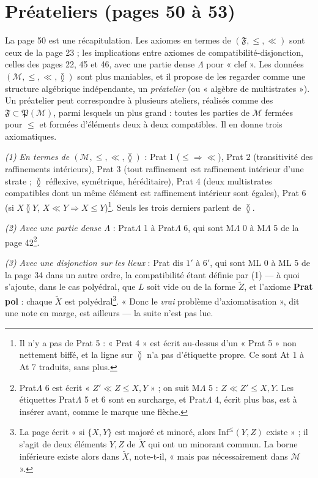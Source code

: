 \documentclass[11pt,a4paper]{article}
\begin{document}
\section*{Préateliers (pages 50 à 53)}

La page 50 est une récapitulation. Les axiomes en termes de $(\mathfrak{F}, \leq,
\ll)$ sont ceux de la page 23 ; les implications entre axiomes de
compatibilité-disjonction, celles des pages 22, 45 et 46, avec une partie dense
$\Lambda$ pour « clef ». Les données $(\mathcal{M}, \leq, \ll, \between)$ sont plus
maniables, et il propose de les regarder comme une structure algébrique
indépendante, un \emph{préatelier} (ou « algèbre de multistrates »). Un préatelier
peut correspondre à plusieurs ateliers, réalisés comme des $\mathfrak{F} \subset
\mathfrak{P}(\mathcal{M})$, parmi lesquels un plus grand : toutes les parties de
$\mathcal{M}$ fermées pour $\leq$ et formées d'éléments deux à deux compatibles.
Il en donne trois axiomatiques.

\emph{(1) En termes de $(\mathcal{M}, \leq, \ll, \between)$} : Prat 1 ($\leq
\Rightarrow \ll$), Prat 2 (transitivité des raffinements intérieurs), Prat 3
(tout raffinement est raffinement intérieur d'une strate ; $\between$ réflexive,
symétrique, héréditaire), Prat 4 (deux multistrates compatibles dont un même
élément est raffinement intérieur sont égales), Prat 6 (si $X \between Y$, $X \ll Y \Rightarrow X \leq
Y$)\footnote{Il n'y a pas de Prat 5 : « Prat 4 » est écrit au-dessus d'un « Prat
5 » non nettement biffé, et la ligne sur $\between$ n'a pas d'étiquette propre.
Ce sont At 1 à At 7 traduits, sans plus.}. Seuls les trois derniers parlent de
$\between$.

\emph{(2) Avec une partie dense $\Lambda$} : Prat$\Lambda$ 1 à Prat$\Lambda$ 6, qui
sont M$\Lambda$ 0 à M$\Lambda$ 5 de la page 42\footnote{Prat$\Lambda$ 6 est écrit
« $Z' \ll Z \leq X, Y$ » ; on suit M$\Lambda$ 5 : $Z \ll Z' \leq X, Y$. Les
étiquettes Prat$\Lambda$ 5 et 6 sont en surcharge, et Prat$\Lambda$ 4, écrit plus
bas, est à insérer avant, comme le marque une flèche.}.

\emph{(3) Avec une disjonction sur les lieux} : Prat dis $1'$ à $6'$, qui sont ML
0 à ML 5 de la page 34 dans un autre ordre, la compatibilité étant définie par (1) --- à quoi s'ajoute,
dans le cas polyédral, que $L$ soit vide ou de la forme $\widetilde{Z}$, et
l'axiome \textbf{Prat pol} : chaque $\widetilde{X}$ est polyédral\footnote{La page
écrit « si $\{X, Y\}$ est majoré et minoré, alors $\mathrm{Inf}^{\leq}(Y, Z)$
existe » ; il s'agit de deux éléments $Y, Z$ de $\widetilde{X}$ qui ont un minorant
commun. La borne inférieure existe alors dans $\widetilde{X}$, note-t-il, « mais
pas nécessairement dans $\mathcal{M}$ ».}. « Donc le \emph{vrai} problème
d'axiomatisation », dit une note en marge, est ailleurs --- la suite n'est pas
lue.
\end{document}
